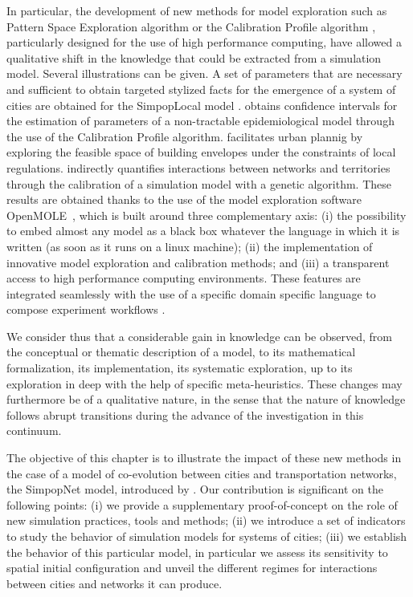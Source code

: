 \documentclass[graybox]{svmult}
\begin{document}
In particular, the development of new methods for model exploration such as Pattern Space Exploration algorithm \cite{cherel2015beyond} or the Calibration Profile algorithm \cite{reuillon2015new}, particularly designed for the use of high performance computing, have allowed a qualitative shift in the knowledge that could be extracted from a simulation model. Several illustrations can be given. A set of parameters that are necessary and sufficient to obtain targeted stylized facts for the emergence of a system of cities are obtained for the SimpopLocal model \cite{pumain2017evaluation}. \cite{arduin2018modelisation} obtains confidence intervals for the estimation of parameters of a non-tractable epidemiological model through the use of the Calibration Profile algorithm. \cite{brasebin2017apports} facilitates urban plannig by exploring the feasible space of building envelopes under the constraints of local regulations. \cite{raimbault2018indirect} indirectly quantifies interactions between networks and territories through the calibration of a simulation model with a genetic algorithm. These results are obtained thanks to the use of the model exploration software OpenMOLE~\cite{reuillon2013openmole}, which is built around three complementary axis: (i) the possibility to embed almost any model as a black box whatever the language in which it is written (as soon as it runs on a linux machine); (ii) the implementation of innovative model exploration and calibration methods; and (iii) a transparent access to high performance computing environments. These features are integrated seamlessly with the use of a specific domain specific language to compose experiment workflows \cite{passerat2017reproducible}.



We consider thus that a considerable gain in knowledge can be observed, from the conceptual or thematic description of a model, to its mathematical formalization, its implementation, its systematic exploration, up to its exploration in deep with the help of specific meta-heuristics. These changes may furthermore be of a qualitative nature, in the sense that the nature of knowledge follows abrupt transitions during the advance of the investigation in this continuum.

The objective of this chapter is to illustrate the impact of these new methods in the case of a model of co-evolution between cities and transportation networks, the SimpopNet model, introduced by \cite{schmitt2014modelisation}. Our contribution is significant on the following points: (i) we provide a supplementary proof-of-concept on the role of new simulation practices, tools and methods; (ii) we introduce a set of indicators to study the behavior of simulation models for systems of cities; (iii) we establish the behavior of this particular model, in particular we assess its sensitivity to spatial initial configuration and unveil the different regimes for interactions between cities and networks it can produce.
\end{document}
